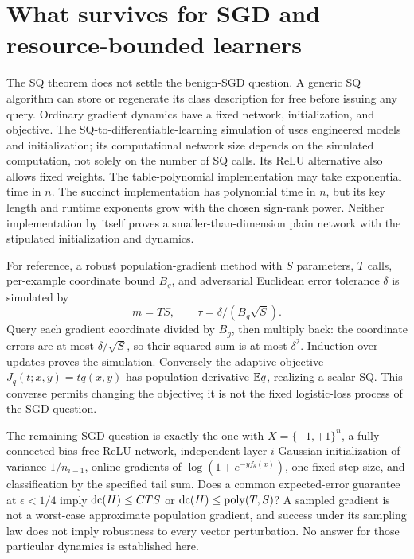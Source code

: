 \section{What survives for SGD and resource-bounded learners}\label{sec:resources}
The SQ theorem does not settle the benign-SGD question. A generic SQ algorithm can store or regenerate its class description for free before issuing any query. Ordinary gradient dynamics have a fixed network, initialization, and objective. The SQ-to-differentiable-learning simulation of \citet{AKMSS21} uses engineered models and initialization; its computational network size depends on the simulated computation, not solely on the number of SQ calls. Its ReLU alternative also allows fixed weights. The table-polynomial implementation may take exponential time in $n$. The succinct implementation has polynomial time in $n$, but its key length and runtime exponents grow with the chosen sign-rank power. Neither implementation by itself proves a smaller-than-dimension plain network with the stipulated initialization and dynamics.

For reference, a robust population-gradient method with $S$ parameters, $T$ calls, per-example coordinate bound $B_g$, and adversarial Euclidean error tolerance $\delta$ is simulated by
\[
 m=TS,\qquad\tau=\delta/(B_g\sqrt S).
\]
Query each gradient coordinate divided by $B_g$, then multiply back: the coordinate errors are at most $\delta/\sqrt S$, so their squared sum is at most $\delta^2$. Induction over updates proves the simulation. Conversely the adaptive objective $J_q(t;x,y)=tq(x,y)$ has population derivative $\mathbb E q$, realizing a scalar SQ. This converse permits changing the objective; it is not the fixed logistic-loss process of the SGD question.

The remaining SGD question is exactly the one with $X=\{-1,+1\}^n$, a fully connected bias-free ReLU network, independent layer-$i$ Gaussian initialization of variance $1/n_{i-1}$, online gradients of $\log(1+e^{-yf_\theta(x)})$, one fixed step size, and classification by the specified tail sum. Does a common expected-error guarantee at $\epsilon<1/4$ imply $\operatorname{dc}(H)\le CTS$ or $\operatorname{dc}(H)\le\operatorname{poly}(T,S)$? A sampled gradient is not a worst-case approximate population gradient, and success under its sampling law does not imply robustness to every vector perturbation. No answer for those particular dynamics is established here.

